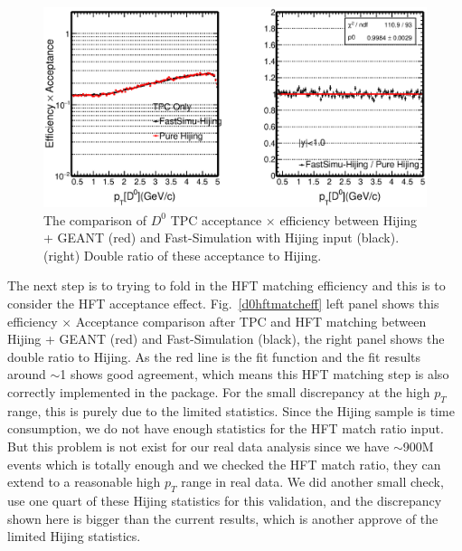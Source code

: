 \begin{figure}[htbp]
\centering
\includegraphics[keepaspectratio,width=1.0\textwidth]{figure/Run14_D0HFT/Physics_FastHijingVsPureHijing_TpcOnly2.eps}
\caption{The comparison of $D^0$ TPC acceptance $\times$ efficiency between Hijing + GEANT (red) and Fast-Simulation with Hijing input (black). (right) Double ratio of these acceptance to Hijing.}
\label{d0tpceff}
\end{figure}

The next step is to trying to fold in the HFT matching efficiency and this is to consider the HFT acceptance effect. Fig.~\ref{d0hftmatcheff} left panel shows this efficiency $\times$ Acceptance comparison after TPC and HFT matching between Hijing + GEANT (red) and Fast-Simulation (black), the right panel shows the double ratio to Hijing. As the red line is the fit function and the fit results around $\sim$1 shows good agreement, which means this HFT matching step is also correctly implemented in the package. For the small discrepancy at the high $p_T$ range, this is purely due to the limited statistics. Since the Hijing sample is time consumption, we do not have enough statistics for the HFT match ratio input. But this problem is not exist for our real data analysis since we have $\sim$900M events which is totally enough and we checked the HFT match ratio, they can extend to a reasonable high $p_T$ range in real data. We did another small check, use one quart of these Hijing statistics for this validation, and the discrepancy shown here is bigger than the current results, which is another approve of the limited Hijing statistics.

